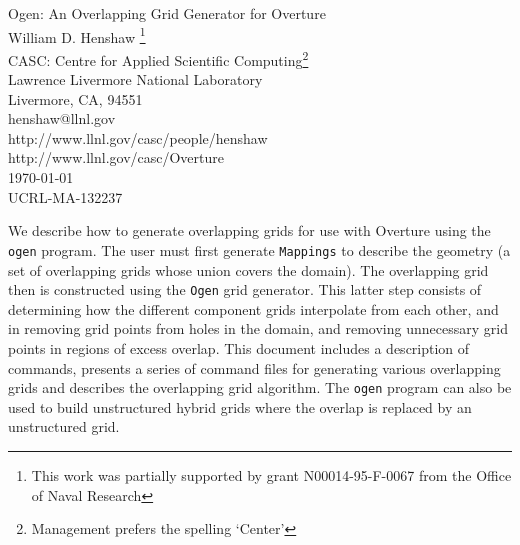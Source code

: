 \documentclass[xcolor=rgb,svgnames,dvipsnames]{article}
\begin{document}
\baselineskip
{}
\begin{flushleft}
{\Large
Ogen: An Overlapping Grid Generator for Overture \\
}
\vspace{2\baselineskip}
William D. Henshaw
\footnote{
        This work was partially
        supported by grant N00014-95-F-0067 from the Office of Naval
        Research}  \\
CASC: Centre for Applied Scientific Computing\footnote{Management prefers the spelling `Center'}  \\
Lawrence Livermore National Laboratory    \\
Livermore, CA, 94551   \\
henshaw@llnl.gov \\
http://www.llnl.gov/casc/people/henshaw \\
http://www.llnl.gov/casc/Overture  \\
\vspace{2\baselineskip}
\today \\
\vspace{\baselineskip}
UCRL-MA-132237

\vspace{4\baselineskip}



We describe how to generate overlapping grids for use with Overture using the
{\tt ogen} program. The user must first generate {\tt Mappings} to describe the
geometry (a set of overlapping grids whose union covers the domain). The overlapping
grid then is constructed using the {\tt Ogen} grid generator. This latter step consists
of determining how the different component grids interpolate from each other, and in
removing grid points from holes in the domain, and removing unnecessary grid points 
in regions of excess overlap. This document includes a description of commands, presents
a series of command files for generating various overlapping grids and describes the
overlapping grid algorithm. The {\tt ogen} program can also be used to build unstructured
hybrid grids where the overlap is replaced by an unstructured grid.
\end{flushleft}

\clearpage
\tableofcontents

\clearpage
\end{document}
